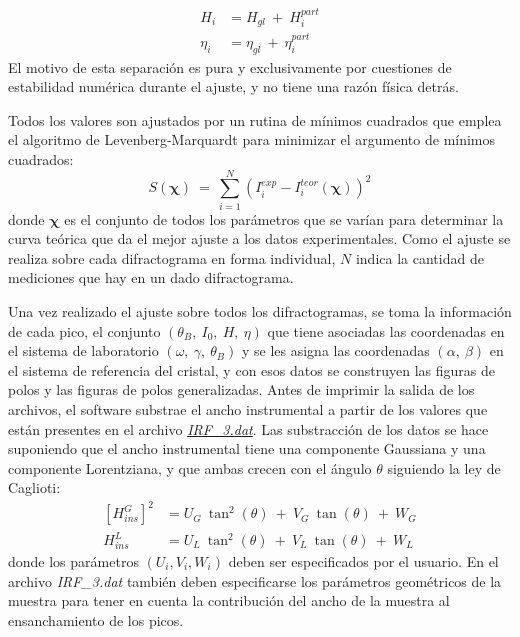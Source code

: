 \begin{align}
  H_i & = H_{gl} \ + \ H_i^{part} \nonumber \\
  \eta_i & =  \eta_{gl} \ + \ \eta_i^{part}
  \label{eq:global}
\end{align}
\noindent
El motivo de esta separación es pura y exclusivamente por cuestiones de estabilidad numérica durante el ajuste, y no tiene una razón física detrás.

Todos los valores son ajustados por un rutina de mínimos cuadrados que emplea el algoritmo de Levenberg-Marquardt\cite{wiki:Levenberg} para minimizar el argumento de mínimos cuadrados:
\begin{equation}
  S(\mathbf{\chi}) \ = \ \sum_{i=1}^{N} (I^{exp}_i - I^{teor}_i(\mathbf{\chi}))^2
  \label{eq:argmin}
\end{equation}
\noindent
donde $\mathbf{\chi}$ es el conjunto de todos los parámetros que se varían para determinar la curva teórica que da el mejor ajuste a los datos experimentales.
Como el ajuste se realiza sobre cada difractograma en forma individual, $N$ indica la cantidad de mediciones que hay en un dado difractograma.

Una vez realizado el ajuste sobre todos los difractogramas, se toma la información de cada pico, el conjunto $(\theta_B, \ I_0, \ H, \ \eta)$ que tiene asociadas las coordenadas en el sistema de laboratorio $(\omega, \ \gamma, \ \theta_B)$ y se les asigna las coordenadas  $(\alpha, \ \beta)$ en el sistema de referencia del cristal, y con esos datos se construyen las figuras de polos y las figuras de polos generalizadas.
Antes de imprimir la salida de los archivos, el software substrae el ancho instrumental a partir de los valores que están presentes en el archivo \hyperlink{IRF}{\textit{IRF\_3.dat}}.
Las substracción de los datos se hace suponiendo que el ancho instrumental tiene una componente Gaussiana y una componente Lorentziana, y que ambas crecen con el ángulo $\theta$ siguiendo la ley de Caglioti\cite{Caglioti1958}:
\begin{align}
  \left[H_{ins}^{G}\right]^2 & =  U_G \ \tan^2(\theta) \ + \ V_G \ \tan(\theta) \ + \ W_G \nonumber \\
  H_{ins}^{L} & =  U_L \ \tan^2(\theta) \ + \ V_L \ \tan(\theta) \ + \ W_L
  \label{eq:caglioti}
\end{align}
\noindent
donde los parámetros $(U_i, V_i, W_i)$ deben ser especificados por el usuario.
En el archivo \textit{IRF\_3.dat} también deben especificarse los parámetros geométricos de la muestra para tener en cuenta la contribución del ancho de la muestra al ensanchamiento de los picos.

